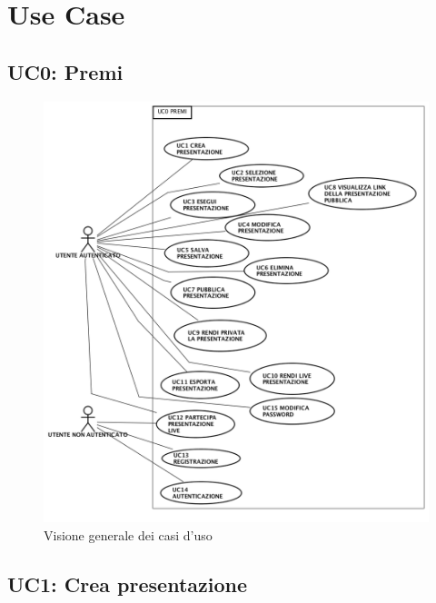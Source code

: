 
\section{Use Case}
\subsection{ UC0: Premi}
\begin{figure}[h]
	\begin{center}
	\includegraphics[scale=0.4]{diagram/UC0.png}
	\caption{Visione generale dei casi d'uso}
	\end{center}
\end{figure}

\subsection{ UC1: Crea presentazione}

